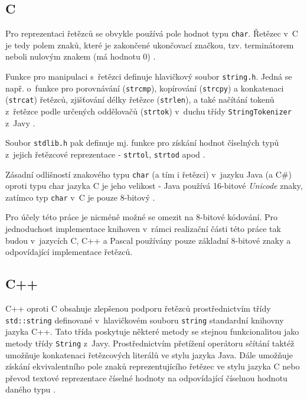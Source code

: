\documentclass{bakalarka}
\begin{document}
\subsection{C}
Pro reprezentaci řetězců se obvykle používá pole hodnot typu \texttt{char}. Řetězec v~C je tedy polem znaků, které je zakončené ukončovací značkou, tzv. terminátorem neboli nulovým znakem (má hodnotu 0) \cite{cpp-guide-chararray}.\par
Funkce pro manipulaci s~řetězci definuje hlavičkový soubor \texttt{string.h}. Jedná se např. o~funkce pro porovnávání (\texttt{strcmp}), kopírování (\texttt{strcpy}) a konkatenaci (\texttt{strcat}) řetězců, zjišťování délky řetězce (\texttt{strlen}), a také načítání tokenů z~řetězce podle určených oddělovačů (\texttt{strtok}) v~duchu třídy \texttt{StringTokenizer} z~Javy \cite{cpp-guide-cstring}.\par
Soubor \texttt{stdlib.h} pak definuje mj. funkce pro získání hodnot číselných typů z~jejich řetězcové reprezentace - \texttt{strtol}, \texttt{strtod} apod \cite{cpp-guide-cstdlib}.\par
Zásadní odlišností znakového typu \texttt{char} (a tím i řetězci) v~jazyku Java (a C\#) oproti typu char jazyka C je jeho velikost - Java používá 16-bitové \textit{Unicode} znaky, zatímco typ \texttt{char} v~C je pouze 8-bitový \cite{cpp-guide-types}.\par
Pro účely této práce je nicméně možné se omezit na 8-bitové kódování. Pro jednoduchost implementace knihoven v~rámci realizační části této práce tak budou v~jazycích C, C++ a Pascal používány pouze základní 8-bitové znaky a odpovídající implementace řetězců.

\subsection{C++}
C++ oproti C obsahuje zlepšenou podporu řetězců prostřednictvím třídy \texttt{std::string} definované v~hlavičkovém souboru \texttt{string} standardní knihovny jazyka C++. Tato třída poskytuje některé metody se stejnou funkcionalitou jako metody třídy \texttt{String} z~Javy. Prostřednictvím přetížení operátoru sčítání taktéž umožňuje konkatenaci řetězcových literálů ve stylu jazyka Java. Dále umožňuje získání ekvivalentního pole znaků reprezentujícího řetězec ve stylu jazyka C nebo převod textové reprezentace číselné hodnoty na odpovídající číselnou hodnotu daného typu \cite{cpp-guide-string, cpp-guide-stdstring}.
\end{document}
